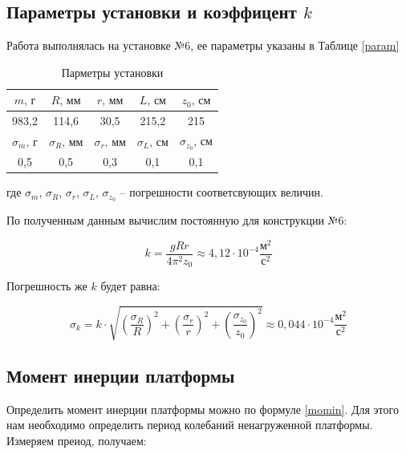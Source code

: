 \documentclass[a4paper,12pt]{article}
\begin{document}
	\subsection{Параметры установки и коэффицент $k$}
	
	Работа выполнялась на установке №6, ее параметры указаны в Таблице \eqref{param}
	\begin{table}[H]
	\begin{center}
		\begin{tabular}{|c|c|c|c|c|}
			\hline
			$m \text{, г}$  & $R\text{, мм}$ & $r\text{, мм}$ & $L\text{, см}$ & $z_0\text{, см}$\\
			\hline
			983,2 & 114,6 & 30,5 & 215,2 & 215\\
			\hline
			\hline
			$\sigma_m \text{, г}$  & $\sigma_R\text{, мм}$ & $\sigma_r\text{, мм}$ & $\sigma_L\text{, см}$ & $\sigma_{z_0}\text{, см}$\\
			\hline
			0,5 & 0,5 & 0,3 & 0,1 & 0,1\\
			\hline 
		\end{tabular}
	\caption{Парметры установки}
	\label{param}
	\end{center}
	\end{table}

	\noindent где $\sigma_m$, $\sigma_R$, $\sigma_r$, $\sigma_L$, $\sigma_{z_0}$ -- погрешности соответсвующих величин.
	
	\bigskip

	По полученным данным вычислим постоянную для конструкции №6:
	
	\begin{equation}
		k = \frac{gRr}{4\pi^2z_0} \approx 4,12\cdot 10^{-4} \frac{\text{м}^2}{\text{с}^2}
	\end{equation}

	Погрешность же $k$ будет равна:
	 
	\begin{equation}
	 	\sigma_k = k \cdot \sqrt{\left( \frac{\sigma_R}{R}\right)^2 + \left( \frac{\sigma_r}{r}\right)^2 + \left( \frac{\sigma_{z_0}}{z_0}\right)^2} \approx 0,044 \cdot 10^{-4} \frac{\text{м}^2}{\text{с}^2}
	\end{equation}
	 
	\subsection{Момент инерции платформы}
	 
	Определить момент инерции платформы можно по формуле \eqref{momin}. Для этого нам необходимо определить период колебаний ненагруженной платформы. Измеряем преиод, получаем:
	
\end{document}
